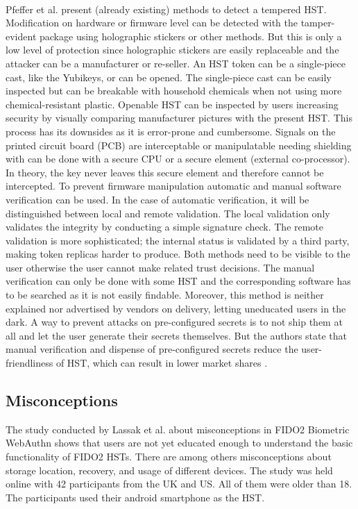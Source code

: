 \documentclass[runningheads]{llncs}
\begin{document}
\paragraph{}
Pfeffer et al. present (already existing) methods to detect a tempered HST.
Modification on hardware or firmware level can be detected with the tamper-evident package using holographic stickers or other methods. But this is only a low level of protection since holographic stickers are easily replaceable and the attacker can be a manufacturer or re-seller. An HST token can be a single-piece cast, like the Yubikeys, or can be opened. The single-piece cast can be easily inspected but can be breakable with household chemicals when not using more chemical-resistant plastic. Openable HST can be inspected by users increasing security by visually comparing manufacturer pictures with the present HST. This process has its downsides as it is error-prone and cumbersome. Signals on the printed circuit board (PCB) are interceptable or manipulatable needing shielding with can be done with a secure CPU or a secure element (external co-processor). In theory, the key never leaves this secure element and therefore cannot be intercepted. To prevent firmware manipulation automatic and manual software verification can be used. In the case of automatic verification, it will be distinguished between local and remote validation. The local validation only validates the integrity by conducting a simple signature check. The remote validation is more sophisticated; the internal status is validated by a third party, making token replicas harder to produce. Both methods need to be visible to the user otherwise the user cannot make related trust decisions.
The manual verification can only be done with some HST and the corresponding software has to be searched as it is not easily findable. Moreover, this method is neither explained nor advertised by vendors on delivery, letting uneducated users in the dark. A way to prevent attacks on pre-configured secrets is to not ship them at all and let the user generate their secrets themselves. But the authors state that manual verification and dispense of pre-configured secrets reduce the user-friendliness of HST, which can result in lower market shares \cite{272198}.

\subsection{Misconceptions}
The study conducted by Lassak et al. \cite{274547} about misconceptions in FIDO2 Biometric WebAuthn shows that users are not yet educated enough to understand the basic functionality of FIDO2 HSTs. There are among others misconceptions about storage location, recovery, and usage of different devices. The study was held online with 42 participants from the UK and US. All of them were older than 18. The participants used their android smartphone as the HST.
\end{document}
